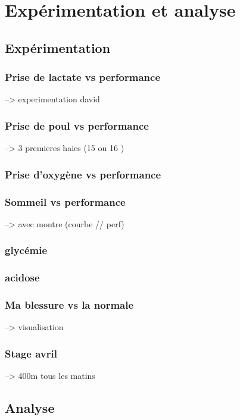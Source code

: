 \chapter{Expérimentation et analyse}
\label{part:experimentation}

\section{Expérimentation}
    \label{chap:exp}
    
    \subsection{Prise de lactate vs performance}
    \label{section:priseLactate}
    --> experimentation david
    
    \subsection{Prise de poul vs performance}
    --> 3 premieres haies (15 ou 16 )
  

    \subsection{Prise d'oxygène vs performance}

    \subsection{Sommeil vs performance}
    --> avec montre (courbe // perf)
  
    \subsection{glycémie}
    
    \subsection{acidose}
    
    \subsection{Ma blessure vs la normale}
    --> visualisation 
    
    
    \subsection{Stage avril}
    --> 400m tous les matins
    

\section{Analyse}


